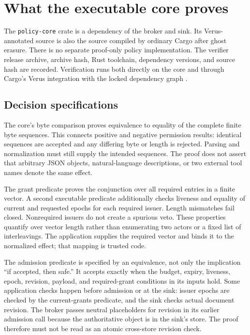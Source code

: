 \section{What the executable core proves}
\label{sec:v2proof}
The \texttt{policy-core} crate is a dependency of the broker and sink. Its
Verus-annotated source is also the source compiled by ordinary Cargo after ghost
erasure. There is no separate proof-only policy implementation. The verifier
release archive, archive hash, Rust toolchain, dependency versions, and source
hash are recorded. Verification runs both directly on the core and through
Cargo's Verus integration with the locked dependency graph \cite{verus}.

\subsection{Decision specifications}
The core's byte comparison proves equivalence to equality of the complete
finite byte sequences. This connects positive and negative permission results:
identical sequences are accepted and any differing byte or length is rejected.
Parsing and normalization must still supply the intended sequences. The proof
does not assert that arbitrary JSON objects, natural-language descriptions, or
two external tool names denote the same effect.

The grant predicate proves the conjunction over all required entries in a
finite vector. A second executable predicate additionally checks liveness and
equality of current and requested epochs for each required issuer. Length
mismatches fail closed. Nonrequired issuers do not create a spurious veto.
These properties quantify over vector length rather than enumerating two
actors or a fixed list of interleavings. The application supplies the required
vector and binds it to the normalized effect; that mapping is trusted code.

The admission predicate is specified by an equivalence, not only the implication
``if accepted, then safe.'' It accepts exactly when the budget, expiry,
liveness, epoch, revision, payload, and required-grant conditions in its inputs
hold. Some application checks happen before admission or at the sink: issuer
epochs are checked by the current-grants predicate, and the sink checks actual
document revision. The broker passes neutral placeholders for revision in its
earlier admission call because the authoritative object is in the sink's store.
The proof therefore must not be read as an atomic cross-store revision check.

